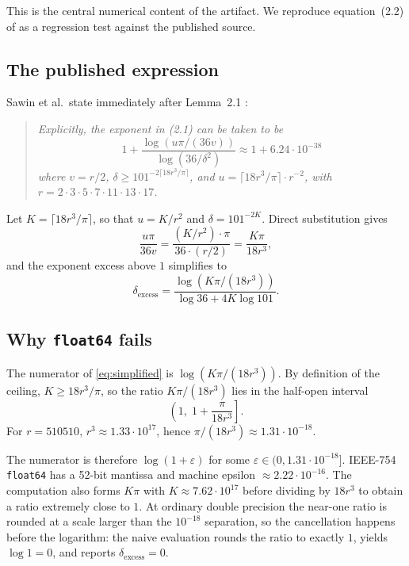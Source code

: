 
This is the central numerical content of the artifact. We reproduce
equation~(2.2) of \cite{Sawin2026Remarks} as a regression test against
the published source.

\subsection{The published expression}

Sawin et al.\ state immediately after Lemma~2.1
\cite[\S2.1, eq.~(2.2)]{Sawin2026Remarks}:

\begin{quote}\itshape
Explicitly, the exponent in (2.1) can be taken to be
\[
  1 + \frac{\log(u \pi / (36 v))}{\log(36 / \delta^2)}
   \approx 1 + 6.24 \cdot 10^{-38}
\]
where $v = r/2$, $\delta \geq 101^{-2 \lceil 18 r^3 / \pi \rceil}$,
and $u = \lceil 18 r^3 / \pi \rceil \cdot r^{-2}$, with
$r = 2 \cdot 3 \cdot 5 \cdot 7 \cdot 11 \cdot 13 \cdot 17$.
\end{quote}

Let $K = \lceil 18 r^3 / \pi \rceil$, so that $u = K / r^2$ and
$\delta = 101^{-2K}$. Direct substitution gives
\[
  \frac{u \pi}{36 v} = \frac{(K / r^2) \cdot \pi}{36 \cdot (r/2)}
                    = \frac{K \pi}{18 r^3},
\]
and the exponent excess above $1$ simplifies to
\begin{equation}
  \delta_{\text{excess}} = \frac{\log(K \pi / (18 r^3))}{\log 36 + 4 K \log 101}.
  \label{eq:simplified}
\end{equation}

\subsection{Why \texttt{float64} fails}

The numerator of \eqref{eq:simplified} is $\log(K \pi / (18 r^3))$.
By definition of the ceiling, $K \geq 18 r^3 / \pi$, so the ratio
$K \pi / (18 r^3)$ lies in the half-open interval
\[
  \left(1,\; 1 + \frac{\pi}{18 r^3}\right] .
\]
For $r = 510510$, $r^3 \approx 1.33 \cdot 10^{17}$, hence
$\pi / (18 r^3) \approx 1.31 \cdot 10^{-18}$.

The numerator is therefore $\log(1 + \varepsilon)$ for some
$\varepsilon \in (0, 1.31 \cdot 10^{-18}]$. IEEE-754 \texttt{float64}
has a 52-bit mantissa and machine epsilon $\approx 2.22 \cdot 10^{-16}$.
The computation also forms $K\pi$ with
$K \approx 7.62 \cdot 10^{17}$ before dividing by $18r^3$ to obtain a
ratio extremely close to $1$. At ordinary double precision the
near-one ratio is rounded at a scale larger than the
$10^{-18}$ separation, so the cancellation happens before the logarithm:
the naive evaluation rounds the ratio to exactly $1$, yields
$\log 1 = 0$, and reports $\delta_{\text{excess}} = 0$.

